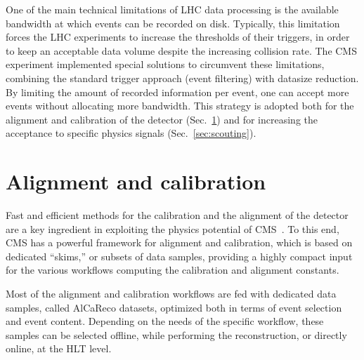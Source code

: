 One of the main technical limitations of LHC data processing is the available bandwidth at which events can be
recorded on disk. Typically, this limitation forces the LHC experiments to increase the thresholds of their
triggers, in order to keep an acceptable data volume despite the
increasing collision rate.  The CMS experiment implemented special
solutions to circumvent these limitations, combining the standard
trigger approach (event filtering) with datasize reduction. By
limiting the amount of recorded information per event, one can accept
more events without allocating more bandwidth. This strategy is
adopted both for the alignment and calibration of the detector
(Sec.~\ref{sec:alca}) and for increasing the acceptance to specific
physics signals (Sec.~\ref{sec:scouting}).


\section{Alignment and calibration}
\label{sec:alca}

Fast and efficient methods for the calibration and the alignment of
the detector are a key ingredient in exploiting the physics potential of
CMS~\cite{Cerminara:1399496,2012AIPC.1504..971E,DeGuio:2121268}. To this end, CMS has a powerful framework for alignment and
calibration, which is based on dedicated ``skims,'' or subsets of data samples, providing a highly
compact input for the various workflows computing the
calibration and alignment constants. 

Most of the alignment and calibration workflows are fed with dedicated
data samples, called AlCaReco datasets, optimized both in terms of event
selection and event content. Depending on the needs of the specific
workflow, these samples can be selected offline, while performing the
reconstruction, or directly online, at the HLT level. 

